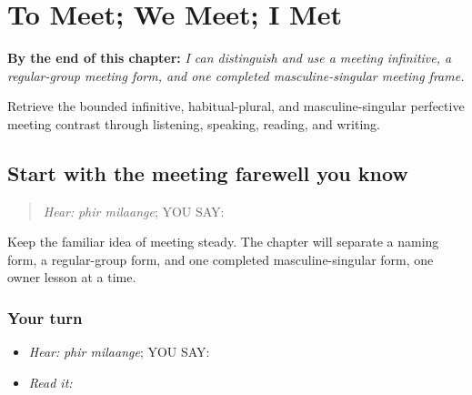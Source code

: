 
\chapter{To Meet; We Meet; I Met}
\label{ch:pa-a2-meeting-family}

\begin{chapteropening}
\textbf{By the end of this chapter:} \emph{I can distinguish and use a meeting infinitive, a regular-group meeting form, and one completed masculine-singular meeting frame.}

Retrieve the bounded infinitive, habitual-plural, and masculine-singular perfective meeting contrast through listening, speaking, reading, and writing.
\end{chapteropening}

\section[\texorpdfstring{\pa{ਫਿਰ} \pa{ਮਿਲਾਂਗੇ} (phir milaange)}{ਫਿਰ ਮਿਲਾਂਗੇ (phir milaange)}]{Start with the meeting farewell you know}

\label{lesson:PA-C188-meeting-return}



\begin{quote}
\emph{Hear:} \emph{phir milaange}; YOU SAY: \textbf{ }
\end{quote}

\begin{grammarlens}[title={Grammar Lens}]
Keep the familiar idea of meeting steady. The chapter will separate a naming form, a regular-group form, and one completed masculine-singular form, one owner lesson at a time.
\end{grammarlens}

\subsection*{Your turn}
\begin{itemize}
\raggedright
  \item \emph{Hear:} \emph{phir milaange}; YOU SAY: \textbf{ }
  \item \emph{Read it:} \textbf{ }
\end{itemize}

